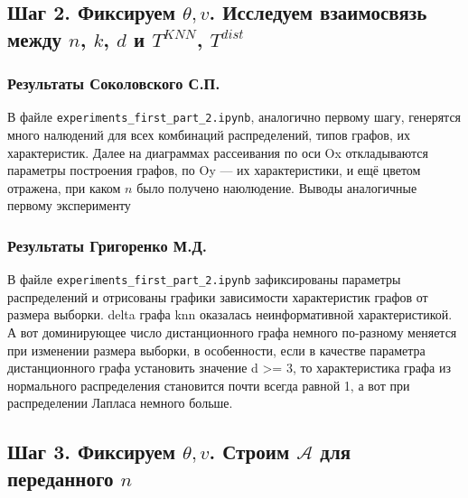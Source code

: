 \documentclass[a4paper,12pt]{article}
\begin{document}
\subsection{Шаг 2. Фиксируем $\theta, v$. Исследуем взаимосвязь между $n$, $k$, $d$ и $T^{KNN}$, $T^{dist}$}
\subsubsection*{Результаты Соколовского С.П.}
В файле \texttt{experiments\_first\_part\_2.ipynb}, аналогично первому шагу, генерятся много налюдений для всех комбинаций распределений, типов графов, их характеристик. Далее на диаграммах рассеивания по оси Ox откладываются параметры построения графов, по Oy --- их характеристики, и ещё цветом отражена, при каком $n$ было получено наюлюдение. Выводы аналогичные первому эксперименту
\subsubsection*{Результаты Григоренко М.Д.}
В файле \texttt{experiments\_first\_part\_2.ipynb} зафиксированы параметры распределений и отрисованы графики зависимости характеристик графов от размера выборки. delta графа knn оказалась неинформативной характеристикой. А вот доминирующее число дистанционного графа немного по-разному меняется при изменении размера выборки, в особенности, если в качестве параметра дистанционного графа установить значение d >= 3, то характеристика графа из нормального распределения становится почти всегда равной 1, а вот при распределении Лапласа немного больше.
\subsection{Шаг 3. Фиксируем $\theta, v$. Строим $\mathcal{A}$ для переданного $n$}
\end{document}
